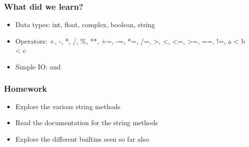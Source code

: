 \documentclass[14pt,compress]{beamer}
\begin{document}
\begin{frame}[fragile]
  \frametitle{What did we learn?}
  \begin{itemize}
    \item Data types: int, float, complex, boolean, string
    \item Operators: +, -, *, /, \%, **, +=, -=, *=, /=, >, <, <=, >=, ==, !=, a < b < c
    \item Simple IO:  and 
  \end{itemize}
\end{frame}

\begin{frame}
  \frametitle{Homework}
  \begin{itemize}
  \item Explore the various string methods
  \item Read the documentation for the string methods
  \item Explore the different builtins seen so far also
  \end{itemize}
\end{frame}
\end{document}
